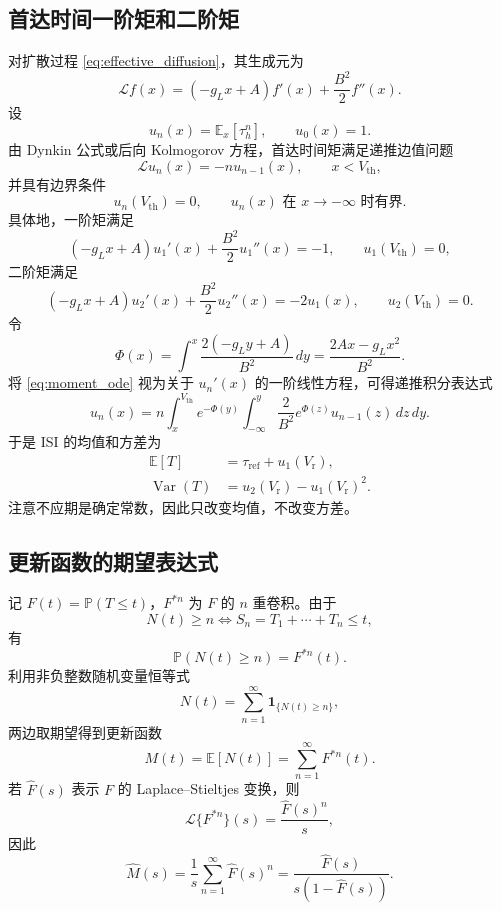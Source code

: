 \documentclass[UTF8]{ctexart}
\begin{document}
\subsection{首达时间一阶矩和二阶矩}

对扩散过程 \eqref{eq:effective_diffusion}，其生成元为
\[
\mathcal L f(x)=(-g_Lx+A)f'(x)+\frac{B^2}{2}f''(x).
\]
设
\[
u_n(x)=\mathbb E_x[\tau_h^n],\qquad u_0(x)=1.
\]
由 Dynkin 公式或后向 Kolmogorov 方程，首达时间矩满足递推边值问题
\begin{equation}
\mathcal L u_n(x)=-n u_{n-1}(x),\qquad x<V_{\mathrm{th}},
\label{eq:moment_ode}
\end{equation}
并具有边界条件
\[
u_n(V_{\mathrm{th}})=0,\qquad u_n(x)\text{ 在 }x\to-\infty\text{ 时有界}.
\]
具体地，一阶矩满足
\begin{equation}
(-g_Lx+A)u_1'(x)+\frac{B^2}{2}u_1''(x)=-1,
\qquad u_1(V_{\mathrm{th}})=0,
\label{eq:first_moment_ode}
\end{equation}
二阶矩满足
\begin{equation}
(-g_Lx+A)u_2'(x)+\frac{B^2}{2}u_2''(x)=-2u_1(x),
\qquad u_2(V_{\mathrm{th}})=0.
\label{eq:second_moment_ode}
\end{equation}
令
\[
\Phi(x)=\int^x \frac{2(-g_Ly+A)}{B^2}\,dy
=\frac{2Ax-g_Lx^2}{B^2}.
\]
将 \eqref{eq:moment_ode} 视为关于 $u_n'(x)$ 的一阶线性方程，可得递推积分表达式
\begin{equation}
u_n(x)=
n\int_x^{V_{\mathrm{th}}}
e^{-\Phi(y)}
\int_{-\infty}^{y}\frac{2}{B^2}e^{\Phi(z)}u_{n-1}(z)\,dz\,dy .
\label{eq:moment_integral}
\end{equation}
于是 ISI 的均值和方差为
\begin{align}
\mathbb E[T]
&=\tau_{\mathrm{ref}}+u_1(V_{\mathrm r}), \label{eq:isi_mean}\\
\operatorname{Var}(T)
&=u_2(V_{\mathrm r})-u_1(V_{\mathrm r})^2. \label{eq:isi_var}
\end{align}
注意不应期是确定常数，因此只改变均值，不改变方差。

\subsection{更新函数的期望表达式}

记 $F(t)=\mathbb P(T\le t)$，$F^{*n}$ 为 $F$ 的 $n$ 重卷积。由于
\[
N(t)\ge n \iff S_n=T_1+\cdots+T_n\le t,
\]
有
\[
\mathbb P(N(t)\ge n)=F^{*n}(t).
\]
利用非负整数随机变量恒等式
\[
N(t)=\sum_{n=1}^{\infty}\mathbf 1_{\{N(t)\ge n\}},
\]
两边取期望得到更新函数
\begin{equation}
M(t)=\mathbb E[N(t)]
=\sum_{n=1}^{\infty}F^{*n}(t).
\label{eq:renewal_mean_exact}
\end{equation}
若 $\widehat F(s)$ 表示 $F$ 的 Laplace--Stieltjes 变换，则
\[
\mathcal L\{F^{*n}\}(s)=\frac{\widehat F(s)^n}{s},
\]
因此
\begin{equation}
\widehat M(s)
=\frac{1}{s}\sum_{n=1}^{\infty}\widehat F(s)^n
=\frac{\widehat F(s)}{s(1-\widehat F(s))}.
\label{eq:renewal_laplace}
\end{equation}
\end{document}
